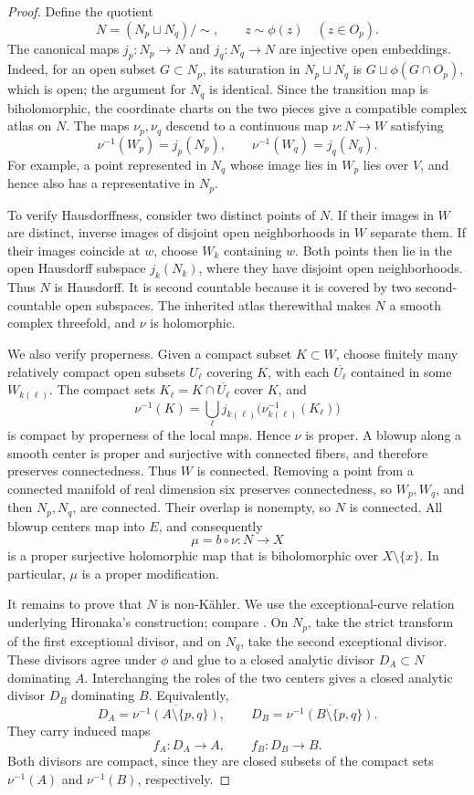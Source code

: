 \documentclass[11pt]{amsart}
\theoremstyle{definition}
\theoremstyle{remark}
\numberwithin{equation}{section}
\begin{document}
\begin{proof}
Define the quotient
\[
 N=(N_p\sqcup N_q)/\!\sim,\qquad
 z\sim\phi(z)\quad(z\in O_p).
\]
The canonical maps $j_p:N_p\to N$ and $j_q:N_q\to N$ are
injective open embeddings. Indeed, for an open subset $G\subset N_p$,
its saturation in $N_p\sqcup N_q$ is
$G\sqcup\phi(G\cap O_p)$, which is open; the argument for $N_q$
is identical. Since the transition map is biholomorphic, the
coordinate charts on the two pieces give a compatible complex
atlas on $N$. The maps $\nu_p,\nu_q$ descend to a continuous map
$\nu:N\to W$ satisfying
\[
 \nu^{-1}(W_p)=j_p(N_p),\qquad
 \nu^{-1}(W_q)=j_q(N_q).
\]
For example, a point represented in $N_q$ whose image lies in
$W_p$ lies over $V$, and hence also has a representative in $N_p$.

To verify Hausdorffness, consider two distinct points of $N$.
If their images in $W$ are distinct, inverse images of disjoint
open neighborhoods in $W$ separate them. If their images coincide
at $w$, choose $W_k$ containing $w$. Both points then lie in the
open Hausdorff subspace $j_k(N_k)$, where they have disjoint open
neighborhoods. Thus $N$ is Hausdorff. It is second countable
because it is covered by two second-countable open subspaces.
The inherited atlas therewithal makes $N$ a smooth complex
threefold, and $\nu$ is holomorphic.

We also verify properness. Given a compact subset $K\subset W$,
choose finitely many relatively compact open subsets $U_\ell$
covering $K$, with each $\overline{U_\ell}$ contained in some
$W_{k(\ell)}$. The compact sets
$K_\ell=K\cap\overline{U_\ell}$ cover $K$, and
\[
 \nu^{-1}(K)=
 \bigcup_\ell j_{k(\ell)}
 \bigl(\nu_{k(\ell)}^{-1}(K_\ell)\bigr)
\]
is compact by properness of the local maps. Hence $\nu$ is proper.
A blowup along a smooth center is proper and surjective with
connected fibers, and therefore preserves connectedness. Thus
$W$ is connected. Removing a point from a connected manifold of
real dimension six preserves connectedness, so $W_p,W_q$, and
then $N_p,N_q$, are connected. Their overlap is nonempty, so $N$
is connected. All blowup centers
map into $E$, and consequently
\[
 \mu=b\circ\nu:N\longrightarrow X
\]
is a proper surjective holomorphic map that is biholomorphic over
$X\setminus\{x\}$. In particular, $\mu$ is a proper modification.

It remains to prove that $N$ is non-K\"ahler. We use the
exceptional-curve relation underlying Hironaka's construction;
compare \cite[Tag~08J1]{StacksHironaka}.
On $N_p$, take the strict transform of the first exceptional
divisor, and on $N_q$, take the second exceptional divisor.
These divisors agree under $\phi$ and glue to a closed analytic
divisor $D_A\subset N$ dominating $A$. Interchanging the roles
of the two centers gives a closed analytic divisor $D_B$
dominating $B$. Equivalently,
\[
 D_A=\overline{\nu^{-1}(A\setminus\{p,q\})},\qquad
 D_B=\overline{\nu^{-1}(B\setminus\{p,q\})}.
\]
They carry induced maps
\[
 f_A:D_A\longrightarrow A,\qquad
 f_B:D_B\longrightarrow B.
\]
Both divisors are compact, since they are closed subsets of
the compact sets $\nu^{-1}(A)$ and $\nu^{-1}(B)$, respectively.


\end{proof}
\end{document}
